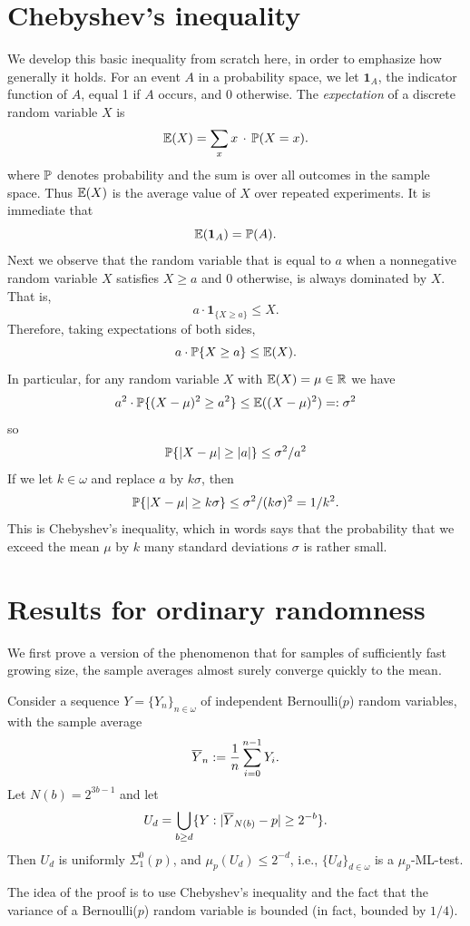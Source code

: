 \section{Chebyshev's inequality}

We develop this basic inequality from scratch here, in order to emphasize how generally it holds. For an event $A$ in a probability space, we let $\mathbf 1_A$, the indicator function of $A$, equal 1 if $A$ occurs, and $0$ otherwise. The \emph{expectation} of a discrete random variable $X$ is 
\[
\mathbb{E}(X)=\sum_x x\,\cdot\,\mathbb{P}(X=x).
\]
where $\mathbb{P}$ denotes probability and the sum is over all outcomes in the sample space. Thus $\mathbb{E}(X)$ is the average value of $X$ over repeated experiments. It is immediate that
\[
\mathbb{E} (\mathbf 1_{A}) = \mathbb{P}(A).
\]
Next we observe that the random variable that is equal to $a$ when a nonnegative random variable $X$ satisfies $X\ge a$ and $0$ otherwise, is always dominated by $X$. That is, 
\[
a\cdot \mathbf 1_{\{X\ge a\}} \le X.
\]
Therefore, taking expectations of both sides,
\[
a\cdot \mathbb{P}{\{X\ge a\}} \le \mathbb{E}(X).
\]
In particular, for any random variable $X$ with $\mathbb{E}(X)=\mu\in\mathbb R$ we have 
\[
a^2\cdot \mathbb{P}{\{(X-\mu)^2\ge a^2\}} \le \mathbb{E} ((X-\mu)^2)=:\sigma^2
\]
so
\[
\mathbb{P}{\{|X-\mu|\ge |a|\}} \le \sigma^2/a^2
\]
If we let $k\in\omega$ and replace $a$ by $k\sigma$, then
\[
\mathbb{P}{\{|X-\mu|\ge k\sigma\}} \le \sigma^2/(k\sigma)^2 = 1/k^2.
\]
This is Chebyshev's inequality, which in words says that the probability that we exceed the mean $\mu$ by $k$ many standard deviations $\sigma$ is rather small.

\section{Results for ordinary randomness}

We first prove a version of the phenomenon that for samples of sufficiently fast growing size, the sample averages almost surely converge quickly to the mean.
					
\begin{proposition}\label{is_test}
Consider a sequence $Y=\{Y_n\}_{n\in\omega}$ of independent Bernoulli($p$) random variables, with the sample average 
\[
\overline Y_n := \frac{1}{n}\sum_{i=0}^{n-1} Y_i.
\]
Let $N(b)=2^{3b-1}$ and let 
\[
U_d=\bigcup_{b\ge d}\{Y: |\overline Y_{N(b)}-p|\ge 2^{-b}\}.
\]
Then $U_d$ is uniformly $\Sigma^0_1(p)$, and $\mu_p(U_d)\le 2^{-d}$, i.e., $\{U_d\}_{d\in\omega}$ is a $\mu_p$-ML-test.
\end{proposition} 
The idea of the proof is to use Chebyshev's inequality and the fact that the variance of a Bernoulli($p$) random variable is bounded (in fact, bounded by $1/4$).


